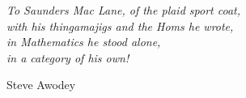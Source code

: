 \clearpage

\thispagestyle{empty}
\null\vfill

\settowidth{}
\begin{center}
\parbox{\longest}{%
\raggedright{\normalsize\itshape%
To Saunders Mac Lane, of the plaid sport coat, \\
with his thingamajigs and the Homs he wrote, \\
in Mathematics he stood alone, \\
in a category of his own! \par \bigskip
} 
\raggedleft\large{Steve Awodey}
\par 
}
\end{center}
\vfill \vfill
\clearpage